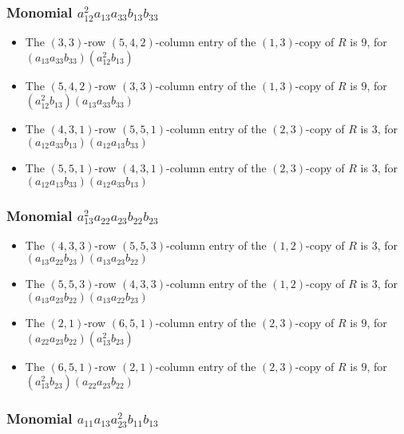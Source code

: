 \documentclass{article}
\begin{document}
\subsubsection{Monomial $ a_{12}^{2} a_{13} a_{33} b_{13} b_{33} $}

\begin{itemize}
\item The $(3, 3)$-row $(5, 4, 2)$-column entry of the $ \left(1, 3\right) $-copy of $R$ is $ 9 $, for $( a_{13} a_{33} b_{33} )( a_{12}^{2} b_{13} )$ 
\item The $(5, 4, 2)$-row $(3, 3)$-column entry of the $ \left(1, 3\right) $-copy of $R$ is $ 9 $, for $( a_{12}^{2} b_{13} )( a_{13} a_{33} b_{33} )$ 
\item The $(4, 3, 1)$-row $(5, 5, 1)$-column entry of the $ \left(2, 3\right) $-copy of $R$ is $ 3 $, for $( a_{12} a_{33} b_{13} )( a_{12} a_{13} b_{33} )$ 
\item The $(5, 5, 1)$-row $(4, 3, 1)$-column entry of the $ \left(2, 3\right) $-copy of $R$ is $ 3 $, for $( a_{12} a_{13} b_{33} )( a_{12} a_{33} b_{13} )$ 
\end{itemize}
\subsubsection{Monomial $ a_{13}^{2} a_{22} a_{23} b_{22} b_{23} $}

\begin{itemize}
\item The $(4, 3, 3)$-row $(5, 5, 3)$-column entry of the $ \left(1, 2\right) $-copy of $R$ is $ 3 $, for $( a_{13} a_{22} b_{23} )( a_{13} a_{23} b_{22} )$ 
\item The $(5, 5, 3)$-row $(4, 3, 3)$-column entry of the $ \left(1, 2\right) $-copy of $R$ is $ 3 $, for $( a_{13} a_{23} b_{22} )( a_{13} a_{22} b_{23} )$ 
\item The $(2, 1)$-row $(6, 5, 1)$-column entry of the $ \left(2, 3\right) $-copy of $R$ is $ 9 $, for $( a_{22} a_{23} b_{22} )( a_{13}^{2} b_{23} )$ 
\item The $(6, 5, 1)$-row $(2, 1)$-column entry of the $ \left(2, 3\right) $-copy of $R$ is $ 9 $, for $( a_{13}^{2} b_{23} )( a_{22} a_{23} b_{22} )$ 
\end{itemize}
\subsubsection{Monomial $ a_{11} a_{13} a_{23}^{2} b_{11} b_{13} $}
\end{document}
